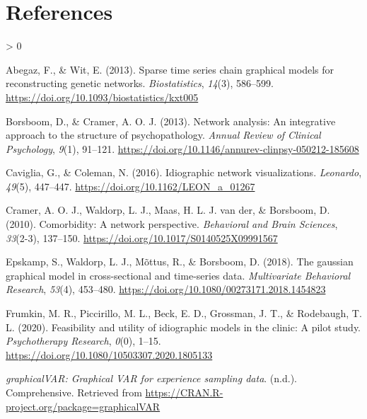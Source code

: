 \documentclass[
  english,
  man]{apa6}
\newlength{\cslhangindent}
\newenvironment{CSLReferences}[2] %
 {%
  \setlength{\parindent}{0pt}
  \ifodd #1 \everypar{\setlength{\hangindent}{\cslhangindent}}\ignorespaces\fi
  \ifnum #2 > 0
  \setlength{\parskip}{#2\baselineskip}
  \fi
 }%
 {}
\begin{document}
\newpage

\hypertarget{references}{%
\section{References}\label{references}}

\begingroup
\setlength{\parindent}{-0.5in}
\setlength{\leftskip}{0.5in}

\hypertarget{refs}{}
\begin{CSLReferences}{1}{0}
\leavevmode\hypertarget{ref-AbegazWit2013}{}%
Abegaz, F., \& Wit, E. (2013). Sparse time series chain graphical models for reconstructing genetic networks. \emph{Biostatistics}, \emph{14}(3), 586--599. \url{https://doi.org/10.1093/biostatistics/kxt005}

\leavevmode\hypertarget{ref-BorsboomCramer2013}{}%
Borsboom, D., \& Cramer, A. O. J. (2013). Network analysis: An integrative approach to the structure of psychopathology. \emph{Annual Review of Clinical Psychology}, \emph{9}(1), 91--121. \url{https://doi.org/10.1146/annurev-clinpsy-050212-185608}

\leavevmode\hypertarget{ref-CavigliaColeman2016}{}%
Caviglia, G., \& Coleman, N. (2016). Idiographic network visualizations. \emph{Leonardo}, \emph{49}(5), 447--447. \url{https://doi.org/10.1162/LEON_a_01267}

\leavevmode\hypertarget{ref-CramerEtAl2010}{}%
Cramer, A. O. J., Waldorp, L. J., Maas, H. L. J. van der, \& Borsboom, D. (2010). Comorbidity: A network perspective. \emph{Behavioral and Brain Sciences}, \emph{33}(2-3), 137--150. \url{https://doi.org/10.1017/S0140525X09991567}

\leavevmode\hypertarget{ref-EpskampEtAl2018b}{}%
Epskamp, S., Waldorp, L. J., Mõttus, R., \& Borsboom, D. (2018). The gaussian graphical model in cross-sectional and time-series data. \emph{Multivariate Behavioral Research}, \emph{53}(4), 453--480. \url{https://doi.org/10.1080/00273171.2018.1454823}

\leavevmode\hypertarget{ref-FrumkinEtAl2020}{}%
Frumkin, M. R., Piccirillo, M. L., Beck, E. D., Grossman, J. T., \& Rodebaugh, T. L. (2020). Feasibility and utility of idiographic models in the clinic: A pilot study. \emph{Psychotherapy Research}, \emph{0}(0), 1--15. \url{https://doi.org/10.1080/10503307.2020.1805133}

\leavevmode\hypertarget{ref-zotero-7045}{}%
\emph{graphicalVAR: Graphical VAR for experience sampling data}. (n.d.). Comprehensive. Retrieved from \url{https://CRAN.R-project.org/package=graphicalVAR}


\end{CSLReferences}
\end{document}
